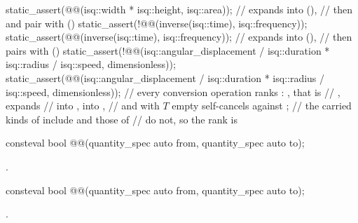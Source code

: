 \begin{example}
\begin{codeblock}
static_assert(@@(isq::width * isq::height, isq::area));
  //  expands into  (),
  // then  and  pair with  ()
static_assert(!@@(inverse(isq::time), isq::frequency));
static_assert(@@(inverse(isq::time), isq::frequency));
  //  expands into  (),
  // then  pairs with  ()
static_assert(!@@(isq::angular_displacement / isq::duration * isq::radius /
                                      isq::speed, dimensionless));
static_assert(@@(isq::angular_displacement / isq::duration * isq::radius /
                                     isq::speed, dimensionless));
  // every conversion operation ranks : , that is
  // , expands
  // into ,  into ,
  // and with $T$ empty  self-cancels against ;
  // the carried kinds of  include  and those of
  //  do not, so the rank is 
\end{codeblock}
\end{example}

\begin{itemdecl}
consteval bool @@(quantity_spec auto from, quantity_spec auto to);
\end{itemdecl}

\begin{itemdescr}
\pnum
\returns
{}.
\end{itemdescr}

\begin{itemdecl}
consteval bool @@(quantity_spec auto from, quantity_spec auto to);
\end{itemdecl}

\begin{itemdescr}
\pnum
\returns
{}.
\end{itemdescr}

